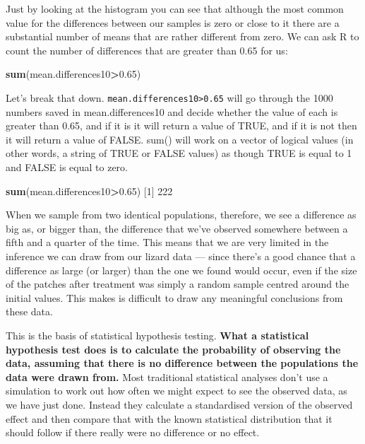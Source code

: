 \documentclass[
]{book}
\newenvironment{Shaded}{\begin{snugshade}}{\end{snugshade}}
\newcommand{\DecValTok}[1]{\textcolor[rgb]{0.00,0.00,0.81}{#1}}
\newcommand{\FloatTok}[1]{\textcolor[rgb]{0.00,0.00,0.81}{#1}}
\newcommand{\KeywordTok}[1]{\textcolor[rgb]{0.13,0.29,0.53}{\textbf{#1}}}
\newcommand{\NormalTok}[1]{#1}
\newcommand{\OperatorTok}[1]{\textcolor[rgb]{0.81,0.36,0.00}{\textbf{#1}}}
\begin{document}
Just by looking at the histogram you can see that although the most common value for the differences between our samples is zero or close to it there are a substantial number of means that are rather different from zero. We can ask R to count the number of differences that are greater than 0.65 for us:

\begin{Shaded}
\begin{Highlighting}[]
\KeywordTok{sum}\NormalTok{(mean.differences10}\OperatorTok{>}\FloatTok{0.65}\NormalTok{)}
\end{Highlighting}
\end{Shaded}

Let's break that down. \texttt{mean.differences10\textgreater{}0.65} will go through the 1000 numbers saved in mean.differences10 and decide whether the value of each is greater than 0.65, and if it is it will return a value of TRUE, and if it is not then it will return a value of FALSE. sum() will work on a vector of logical values (in other words, a string of TRUE or FALSE values) as though TRUE is equal to 1 and FALSE is equal to zero.

\begin{Shaded}
\begin{Highlighting}[]
\KeywordTok{sum}\NormalTok{(mean.differences10}\OperatorTok{>}\FloatTok{0.65}\NormalTok{)}
\NormalTok{[}\DecValTok{1}\NormalTok{] }\DecValTok{222}
\end{Highlighting}
\end{Shaded}

When we sample from two identical populations, therefore, we see a difference as big as, or bigger than, the difference that we've observed somewhere between a fifth and a quarter of the time. This means that we are very limited in the inference we can draw from our lizard data --- since there's a good chance that a difference as large (or larger) than the one we found would occur, even if the size of the patches after treatment was simply a random sample centred around the initial values. This makes is difficult to draw any meaningful conclusions from these data.

This is the basis of statistical hypothesis testing. \textbf{What a statistical hypothesis test does is to calculate the probability of observing the data, assuming that there is no difference between the populations the data were drawn from.} Most traditional statistical analyses don't use a simulation to work out how often we might expect to see the observed data, as we have just done. Instead they calculate a standardised version of the observed effect and then compare that with the known statistical distribution that it should follow if there really were no difference or no effect.
\end{document}
